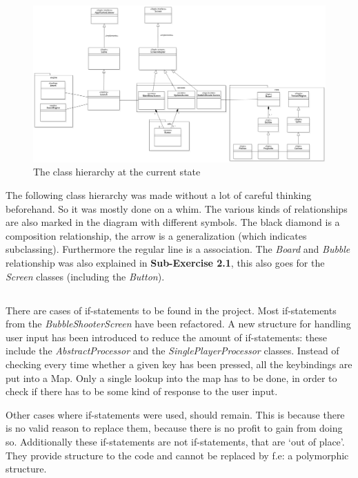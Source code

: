 \documentclass[a4paper,11pt]{article}
\begin{document}
\subsection{}
\begin{figure}[h]
\includegraphics[width=\textwidth]{class_hierarchy}
\caption{The class hierarchy at the current state}
\end{figure}
The following class hierarchy was made without a lot of careful thinking beforehand. So it was mostly done on a whim. The various kinds of relationships are also marked in the diagram with different symbols. The black diamond is a composition relationship, the arrow is a generalization (which indicates subclassing). Furthermore the regular line is a association. The \textit{Board} and \textit{Bubble} relationship was also explained in \textbf{Sub-Exercise 2.1}, this also goes for the \textit{Screen} classes (including the \textit{Button}).

\subsection{}
There are cases of if-statements to be found in the project. Most if-statements from the \textit{BubbleShooterScreen} have been refactored. A new structure for handling user input has been introduced to reduce the amount of if-statements: these include the \textit{AbstractProcessor} and the \textit{SinglePlayerProcessor} classes. Instead of checking every time whether a given key has been pressed, all the keybindings are put into a Map. Only a single lookup into the map has to be done, in order to check if there has to be some kind of response to the user input.
\par Other cases where if-statements were used, should remain. This is because there is no valid reason to replace them, because there is no profit to gain from doing so. Additionally these if-statements are not if-statements, that are `out of place'. They provide structure to the code and cannot be replaced by f.e: a polymorphic structure.
\end{document}
